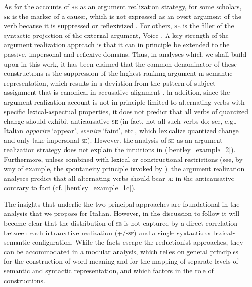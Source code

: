 \documentclass[output=paper,colorlinks,citecolor=brown
]{langscibook}
\begin{document}
As for the accounts of \textsc{se} as an argument realization strategy, for some scholars, \textsc{se} is the marker of a causer, which is not expressed as an overt argument of the verb because it is suppressed or reflexivized \citep{rothemerg1974verbes,vanvalin1990semantic,labelle1992change,cennamo1995patterns,centineo1995distribution,bentley2006split,koontz2009anticausativization}. For others, \textsc{se} is the filler of the syntactic projection of the external argument, Voice \citep{alexiadou2006properties,alexiadou2015external}. A key strength of the argument realization approach is that it can in principle be extended to the passive, impersonal and reflexive domains. Thus, in analyses which we shall build upon in this work, it has been claimed that the common denominator of these constructions is the suppression of the highest-ranking argument in semantic representation, which results in a deviation from the pattern of subject assignment that is canonical in accusative alignment \citep{vanvalin1990semantic,centineo1995distribution,bentley2006split,bentley2023internally,gonzales2006construcciones}. In addition, since the argument realization account is not in principle limited to alternating verbs with specific lexical-aspectual properties, it does not predict that all verbs of quantized change should exhibit anticausative \textsc{se} (in fact, not all such verbs do; see, e.g., Italian \textit{apparire} ‘appear’, \textit{svenire} ‘faint’, etc., which lexicalize quantized change and only take impersonal \textsc{se}). However, the analysis of \textsc{se} as an argument realization strategy does not explain the intuitions in (\ref{bentley_example_2}). Furthermore, unless combined with lexical or constructional restrictions (see, by way of example, the spontaneity principle invoked by \cite[96, 114—120]{alexiadou2015external}), the argument realization analyses predict that all alternating verbs should bear \textsc{se} in the anticausative, contrary to fact (cf. \ref{bentley_example_1c}). 

The insights that underlie the two principal approaches are foundational in the analysis that we propose for Italian. However, in the discussion to follow it will become clear that the distribution of \textsc{se} is not captured by a direct correlation between each intransitive realization (+/-\textsc{se}) and a single syntactic or lexical-semantic configuration. While the facts escape the reductionist approaches, they can be accommodated in a modular analysis, which relies on general principles for the construction of word meaning and for the mapping of separate levels of semantic and syntactic representation, and which factors in the role of constructions. 
\end{document}
